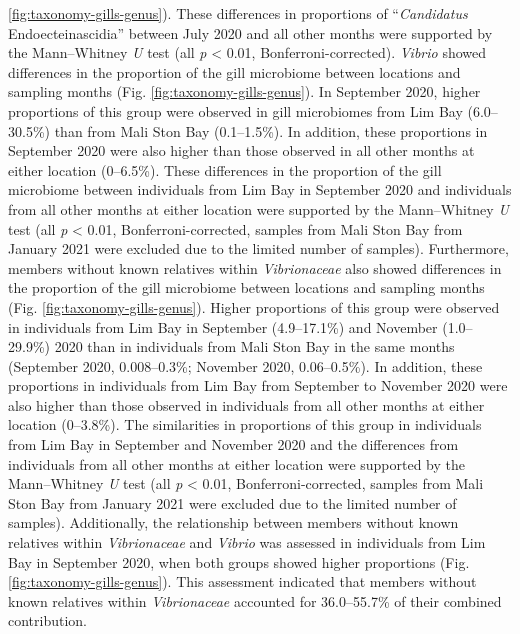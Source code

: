 \documentclass[
  12 pt,
]{article}
\begin{document}
\ref{fig:taxonomy-gills-genus}). These differences in proportions of ``\emph{Candidatus} Endoecteinascidia'' between July 2020 and all other months were supported by the Mann--Whitney \emph{U} test (all \emph{p} \textless{} 0.01, Bonferroni-corrected). \emph{Vibrio} showed differences in the proportion of the gill microbiome between locations and sampling months (Fig. \ref{fig:taxonomy-gills-genus}). In September 2020, higher proportions of this group were observed in gill microbiomes from Lim Bay (6.0--30.5\unit{\percent}) than from Mali Ston Bay (0.1--1.5\unit{\percent}). In addition, these proportions in September 2020 were also higher than those observed in all other months at either location (0--6.5\unit{\percent}). These differences in the proportion of the gill microbiome between individuals from Lim Bay in September 2020 and individuals from all other months at either location were supported by the Mann--Whitney \emph{U} test (all \emph{p} \textless{} 0.01, Bonferroni-corrected, samples from Mali Ston Bay from January 2021 were excluded due to the limited number of samples). Furthermore,
members without known relatives within \emph{Vibrionaceae} also showed differences in the proportion of the gill microbiome between locations and sampling months (Fig. \ref{fig:taxonomy-gills-genus}). Higher proportions of this group were observed in individuals from Lim Bay in September (4.9--17.1\unit{\percent}) and November (1.0--29.9\unit{\percent}) 2020 than in individuals from Mali Ston Bay in the same months (September 2020, 0.008--0.3\unit{\percent}; November 2020, 0.06--0.5\unit{\percent}). In addition, these proportions in individuals from Lim Bay from September to November 2020 were also higher than those observed in individuals from all other months at either location (0--3.8\unit{\percent}). The similarities in proportions of this group in individuals from Lim Bay in September and November 2020 and the differences from individuals from all other months at either location were supported by the Mann--Whitney \emph{U} test (all \emph{p} \textless{} 0.01, Bonferroni-corrected, samples from Mali Ston Bay from January 2021 were excluded due to the limited number of samples). Additionally, the relationship between members without known relatives within \emph{Vibrionaceae} and \emph{Vibrio} was assessed in individuals from Lim Bay in September 2020, when both groups showed higher proportions (Fig. \ref{fig:taxonomy-gills-genus}). This assessment indicated that members without known relatives within \emph{Vibrionaceae} accounted for 36.0--55.7\unit{\percent} of their combined contribution.
\end{document}
